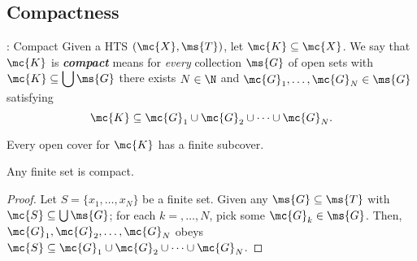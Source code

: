 \subsection{Compactness}
\begin{ndef}{: Compact}
	Given a HTS \((\mc{X},\ms{T})\), let \(\mc{K}\subseteq\mc{X}\). We say that \(\mc{K}\) is \emph{\textbf{compact}} means for \emph{every} collection \(\ms{G}\) of open sets with \(\mc{K}\subseteq\displaystyle\bigcup\ms{G}\) there exists \(N\in\N\) and \(\mc{G}_1,\dots,\mc{G}_N\in\ms{G}\) satisfying 
	\begin{equation*}
		\mc{K}\subseteq\mc{G}_1\cup\mc{G}_2\cup\dots\cup\mc{G}_N.
	\end{equation*}
\end{ndef}
\begin{note}
	Every open cover for \(\mc{K}\) has a finite subcover.
\end{note}
\begin{corollary}
	Any finite set is compact. 
\end{corollary}
\begin{proof}
	Let \(S=\{x_1,\dots,x_N\}\) be a finite set. Given any \(\ms{G}\subseteq\ms{T}\) with \(\mc{S}\subseteq\bigcup\ms{G}\); for each \(k=,\dots,N\), pick some \(\mc{G}_k\in\ms{G}\). Then, \(\mc{G}_1,\mc{G}_2,\dots,\mc{G}_N\) obeys \(\mc{S}\subseteq\mc{G}_1\cup\mc{G}_2\cup\dots\cup\mc{G}_N\).
\end{proof}